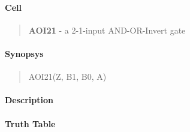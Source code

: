 \label{AOI21}
\paragraph{Cell}
\begin{quote}
    \textbf{AOI21} - a 2-1-input AND-OR-Invert gate
\end{quote}

\paragraph{Synopsys}
\begin{quote}
    AOI21(Z, B1, B0, A)
\end{quote}

\paragraph{Description}



\paragraph{Truth Table}


